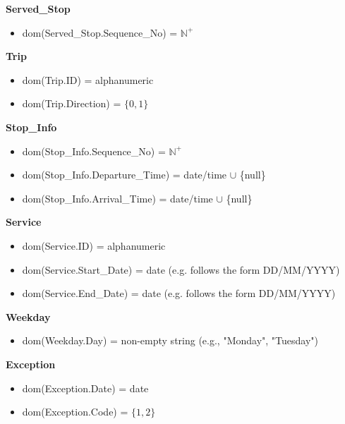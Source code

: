 \documentclass[a4paper, 12pt]{article}
\begin{document}
\textbf{Served\_Stop}
\begin{itemize}
    \item dom(Served\_Stop.Sequence\_No) = $\mathbb{N}^+$
\end{itemize}

\textbf{Trip}
\begin{itemize}
    \item dom(Trip.ID) = alphanumeric
    \item dom(Trip.Direction) = $\{0, 1\}$
\end{itemize}

\textbf{Stop\_Info}
\begin{itemize}
    \item dom(Stop\_Info.Sequence\_No) = $\mathbb{N}^+$
    \item dom(Stop\_Info.Departure\_Time) = date/time $\cup$ \{null\}
    \item dom(Stop\_Info.Arrival\_Time) = date/time $\cup$ \{null\}
\end{itemize}

\textbf{Service}
\begin{itemize}
    \item dom(Service.ID) = alphanumeric
    \item dom(Service.Start\_Date) = date (e.g. follows the form DD/MM/YYYY)
    \item dom(Service.End\_Date) = date (e.g. follows the form DD/MM/YYYY)
\end{itemize}

\textbf{Weekday}
\begin{itemize}
    \item dom(Weekday.Day) = non-empty string (e.g., "Monday", "Tuesday")
\end{itemize}

\textbf{Exception}
\begin{itemize}
    \item dom(Exception.Date) = date
    \item dom(Exception.Code) = $\{1, 2\}$ %
\end{itemize}

\newpage
\end{document}

